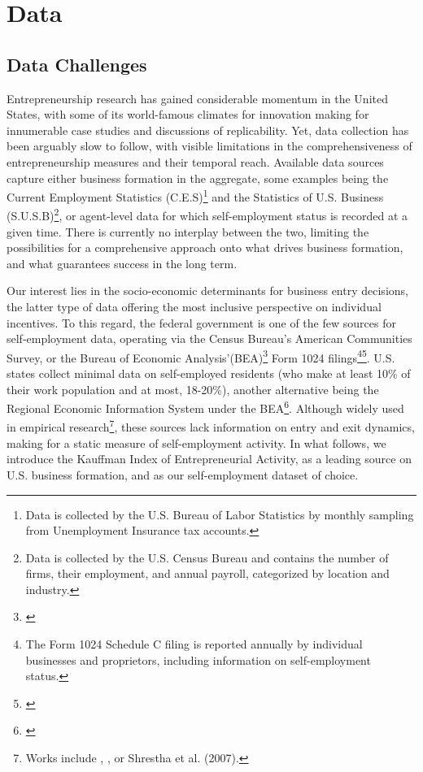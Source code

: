 \chapter{Data\label{ch:data}}

\section{Data Challenges}

Entrepreneurship research has gained considerable momentum in the United States, with some of its world-famous climates for innovation making for innumerable case studies and discussions of replicability. Yet, data collection has been arguably slow to follow, with visible limitations in the comprehensiveness of entrepreneurship measures and their temporal reach. Available data sources capture either business formation in the aggregate, some examples being the Current Employment Statistics (C.E.S)\footnote{Data is collected by the U.S. Bureau of Labor Statistics by monthly sampling from Unemployment Insurance tax accounts.} and the Statistics of U.S. Business (S.U.S.B)\footnote{Data is collected by the U.S. Census Bureau and contains the number of firms, their employment, and annual payroll, categorized by location and industry.}, or agent-level data for which self-employment status is recorded at a given time. There is currently no interplay between the two, limiting the possibilities for a comprehensive approach onto what drives business formation, and what guarantees success in the long term. 

Our interest lies in the socio-economic determinants for business entry decisions, the latter type of data offering the most inclusive perspective on individual incentives. To this regard, the federal government is one of the few sources for self-employment data, operating via the Census Bureau’s American Communities Survey, or the Bureau of Economic Analysis'(BEA)\footnote{\cite{BEA}} Form 1024 filings\footnote{The Form 1024 Schedule C filing is reported annually by individual businesses and proprietors, including information on self-employment status. }\footnote{\cite{Goetz2008}}. U.S. states collect minimal data on self-employed residents (who make at least 10\% of their work population and at most, 18-20\%), another alternative being the Regional Economic Information System under the BEA\footnote{\cite{Goetz2008}}. Although widely used in empirical research\footnote{Works include \cite{Glaeser2007}, \cite{AcsArmington2006}, or Shrestha et al. (2007). }, these sources lack information on entry and exit dynamics, making for a  static measure of self-employment activity. In what follows, we introduce the Kauffman Index of Entrepreneurial Activity, as a leading source on U.S. business formation, and as our self-employment dataset of choice. 

